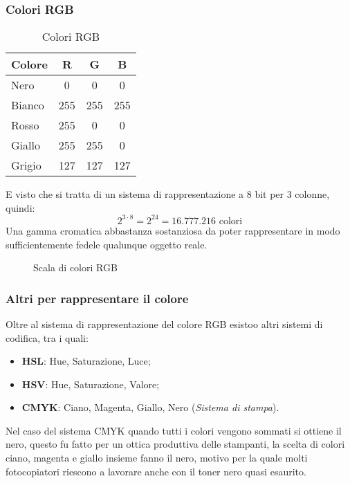 \subsubsection{Colori RGB}
\label{sec:rgbcolor}
\begin{table}[ht!]
  \centering
  \begin{tabular}{lccc}
    \textbf{Colore}& \textbf{R} & \textbf{G} & \textbf{B}\\\hline
    Nero & 0 & 0 & 0\\
    Bianco & 255 & 255 & 255\\
    {\color{red}Rosso} & 255 & 0 & 0\\
    {\color{yellow}Giallo} & 255 & 255 & 0\\
    {\color{gray}Grigio} & 127 & 127 & 127\\\hline
  \end{tabular}
  \caption{Colori RGB}
  \label{tab:rgb}
\end{table}
E visto che si tratta di un sistema di rappresentazione a 8 bit per 3
colonne, quindi:
\begin{equation*}
  2^{3\cdot 8} =2^{24} = 16.777.216 \text{ colori}
\end{equation*}
Una gamma cromatica abbastanza sostanziosa da poter rappresentare in modo
sufficientemente fedele qualunque oggetto reale.
\begin{figure}[ht!]
  \centering
  \resizebox{8cm}{!}{
  }
  \caption{Scala di colori RGB}
  \label{fig:rgb}
\end{figure}
\subsubsection{Altri per rappresentare il colore}
\label{sec:altcolorr}

Oltre al sistema di rappresentazione del colore RGB esistoo altri sistemi
di codifica, tra i quali:
\begin{itemize}
\item \textbf{HSL}: Hue, Saturazione, Luce;
\item \textbf{HSV}: Hue, Saturazione, Valore;
\item \textbf{CMYK}: Ciano, Magenta, Giallo, Nero (\textit{Sistema di
    stampa}).
\end{itemize}
\begin{nota}
  Nel caso del sistema CMYK quando tutti i colori vengono sommati si
  ottiene il nero, questo fu fatto per un ottica produttiva delle
  stampanti, la scelta di colori ciano, magenta e giallo insieme
  fanno il nero, motivo per la quale molti fotocopiatori riescono
  a lavorare anche con il toner nero quasi esaurito.
\end{nota}
